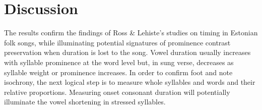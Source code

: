 \documentclass[12pt]{article}
\begin{document}
\section*{Discussion}

The results confirm the findings of Ross \& Lehiste's studies on timing in Estonian folk songs, while illuminating potential signatures of prominence contrast preservation when duration is lost to the song. Vowel duration usually increases with syllable prominence at the word level but, in sung verse, decreases as syllable weight or prominence increases. In order to confirm foot and note isochrony, the next logical step is to measure whole syllables and words and their relative proportions. Measuring onset consonant duration will potentially illuminate the vowel shortening in stressed syllables. 

% 
% 

%
\end{document}
